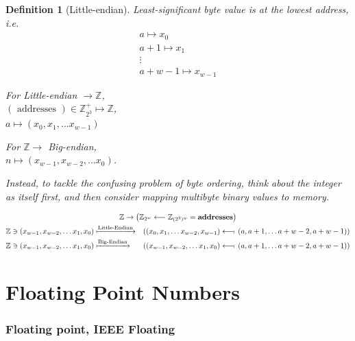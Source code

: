 \documentclass[10pt]{amsart}
\newtheorem{definition}{Definition}
\begin{document}
\begin{definition}[Little-endian]
	Least-significant byte value is at the lowest address, i.e.
	\begin{equation}
	\begin{gathered}
	a \mapsto x_0 \\
	a + 1 \mapsto x_1 \\
	\vdots \\
	a+w - 1 \mapsto x_{w-1}
	\end{gathered}
	\end{equation}
	
	For Little-endian $\to \mathbb{Z}$, \\
	$( \text{ addresses } ) \in \mathbb{Z}^+_{2^3} \mapsto \mathbb{Z}$, \\
	$a \mapsto (x_0, x_1, \dots x_{w-1})$
	
	For $\mathbb{Z} \to $ Big-endian, \\
	$n \mapsto (x_{w-1}, x_{w-2}, \dots x_0)$.
	
	Instead, to tackle the confusing problem of byte ordering, think about the integer as itself first, and then consider \emph{mapping multibyte binary values to memory}.
	
	\begin{equation}
	\begin{gathered}
	\mathbb{Z} \to \left( \mathbb{Z}_{2^w} \longleftarrow \mathbb{Z}_{(2^3)^w} = \textbf{addresses}  \right) \\
	\begin{aligned}
	& \mathbb{Z} \ni (x_{w-1}, x_{w-2}, \dots x_1, x_0) \xmapsto{\text{Little-Endian}}  & \left((x_0, x_1 , \dots x_{w-2}, x_{w-1}) \longleftarrow\!\shortmid \,  (a, a+1, \dots a + w-2, a+w-1)\right) \\
	& \mathbb{Z} \ni (x_{w-1}, x_{w-2}, \dots x_1, x_0) \xmapsto{\text{Big-Endian}}  & \left((x_{w-1}, x_{w-2} , \dots x_{1}, x_{0}) \longleftarrow\!\shortmid \,  (a, a+1, \dots a + w-2, a+w-1)\right) 
	\end{aligned}
	\end{gathered}
	\end{equation}
	
\end{definition}

\part{Floating Point Numbers}

\section{Floating point, IEEE Floating}
\end{document}
